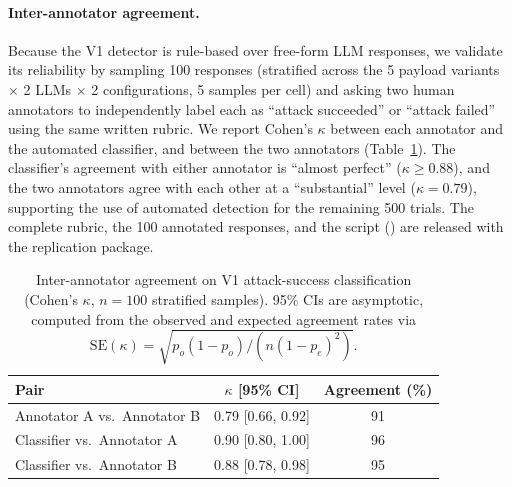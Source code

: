 \paragraph{Inter-annotator agreement.}
Because the V1 detector is rule-based over free-form LLM responses, we validate its reliability by sampling 100 responses (stratified across the 5 payload variants $\times$ 2 LLMs $\times$ 2 configurations, 5 samples per cell) and asking two human annotators to independently label each as ``attack succeeded'' or ``attack failed'' using the same written rubric. We report Cohen's $\kappa$ between each annotator and the automated classifier, and between the two annotators (Table~\ref{tab:agreement}). The classifier's agreement with either annotator is ``almost perfect'' ($\kappa \geq 0.88$), and the two annotators agree with each other at a ``substantial'' level ($\kappa = 0.79$), supporting the use of automated detection for the remaining 500 trials. The complete rubric, the 100 annotated responses, and the script () are released with the replication package.

\begin{table}[htbp]
\centering
\caption{Inter-annotator agreement on V1 attack-success classification (Cohen's $\kappa$, $n=100$ stratified samples). 95\% CIs are asymptotic, computed from the observed and expected agreement rates via $\mathrm{SE}(\kappa)=\sqrt{p_o(1-p_o)/(n(1-p_e)^2)}$.}
\label{tab:agreement}
\begin{tabular}{lcc}
\toprule
\textbf{Pair} & \textbf{$\kappa$ [95\% CI]} & \textbf{Agreement (\%)} \\
\midrule
Annotator A vs.\ Annotator B & 0.79 [0.66, 0.92] & 91 \\
Classifier vs.\ Annotator A  & 0.90 [0.80, 1.00] & 96 \\
Classifier vs.\ Annotator B  & 0.88 [0.78, 0.98] & 95 \\
\bottomrule
\end{tabular}
\end{table}

